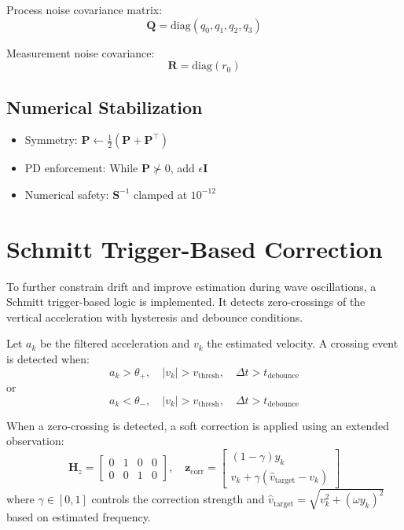 \documentclass[11pt,letterpaper]{article}
\begin{document}
Process noise covariance matrix:
\begin{equation}
\bm{Q} = \mathrm{diag}(q_0, q_1, q_2, q_3)
\end{equation}

Measurement noise covariance:
\begin{equation}
\bm{R} = \mathrm{diag}(r_0)
\end{equation}

\subsection*{Numerical Stabilization}
\begin{itemize}
\item Symmetry: $\bm{P} \leftarrow \frac{1}{2}(\bm{P}+\bm{P}^\top)$
\item PD enforcement: While $\bm{P} \not\succ 0$, add $\epsilon\bm{I}$
\item Numerical safety: $\bm{S}^{-1}$ clamped at $10^{-12}$
\end{itemize}


\section{Schmitt Trigger-Based Correction}
To further constrain drift and improve estimation during wave oscillations, a Schmitt trigger-based logic is implemented. It detects zero-crossings of the vertical acceleration with hysteresis and debounce conditions.

Let \( a_k \) be the filtered acceleration and \( v_k \) the estimated velocity. A crossing event is detected when:
\[
a_k > \theta_{+}, \quad |v_k| > v_\text{thresh}, \quad \Delta t > t_\text{debounce}
\]
or
\[
a_k < \theta_{-}, \quad |v_k| > v_\text{thresh}, \quad \Delta t > t_\text{debounce}
\]

When a zero-crossing is detected, a soft correction is applied using an extended observation:
\[
\mathbf{H}_z =
\begin{bmatrix}
0 & 1 & 0 & 0 \\
0 & 0 & 1 & 0
\end{bmatrix}, \quad
\mathbf{z}_\text{corr} =
\begin{bmatrix}
(1 - \gamma)y_k \\
v_k + \gamma(\hat{v}_\text{target} - v_k)
\end{bmatrix}
\]
where \( \gamma \in [0,1] \) controls the correction strength and \( \hat{v}_\text{target} = \sqrt{v_k^2 + (\omega y_k)^2} \) based on estimated frequency.
\end{document}
